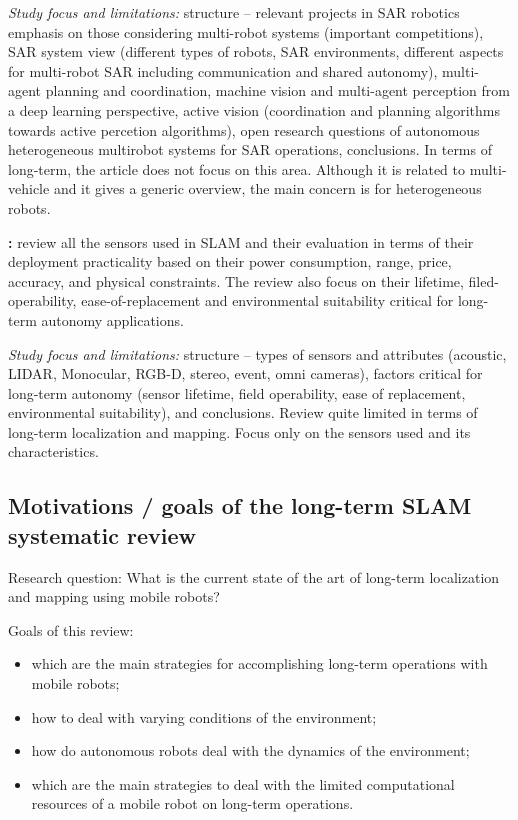\documentclass[10pt,a4paper,notitlepage,twocolumn,oneside]{article}
\begin{document}
\textit{Study focus and limitations:} structure -- relevant projects in SAR robotics emphasis on those considering multi-robot systems (important competitions), SAR system view (different types of robots, SAR environments, different aspects for multi-robot SAR including communication and shared autonomy), multi-agent planning and coordination, machine vision and multi-agent perception from a deep learning perspective, active vision (coordination and planning algorithms towards active percetion algorithms), open research questions of autonomous heterogeneous multirobot systems for SAR operations, conclusions. In terms of long-term, the article does not focus on this area. Although it is related to multi-vehicle and it gives a generic overview, the main concern is for heterogeneous robots.

\textbf{\cite{review:zaffar:2018}:} review all the sensors used in SLAM and their evaluation in terms of their deployment practicality based on their power consumption, range, price, accuracy, and physical constraints. The review also focus on their lifetime, filed-operability, ease-of-replacement and environmental suitability critical for long-term autonomy applications.

\textit{Study focus and limitations:} structure -- types of sensors and attributes (acoustic, LIDAR, Monocular, RGB-D, stereo, event, omni cameras), factors critical for long-term autonomy (sensor lifetime, field operability, ease of replacement, environmental suitability), and conclusions. Review quite limited in terms of long-term localization and mapping. Focus only on the sensors used and its characteristics.

\subsection{Motivations / goals of the long-term SLAM systematic review}

Research question: What is the current state of the art of long-term localization and mapping using mobile robots?

Goals of this review:

\begin{itemize}\setlength\itemsep{-0.5em}
\item which are the main strategies for accomplishing long-term operations with mobile robots;
\item how to deal with varying conditions of the environment;
\item how do autonomous robots deal with the dynamics of the environment;
\item which are the main strategies to deal with the limited computational resources of a mobile robot on long-term operations.
\end{itemize}
\end{document}
